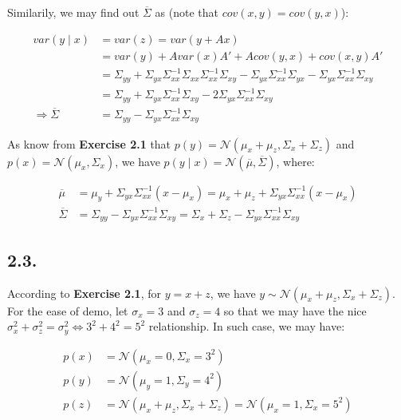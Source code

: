 \documentclass[11pt]{article}
\begin{document}
Similarily, we may find out $\overline{\Sigma}$ as (note that $cov(x, y) = cov(y, x)$):


\begin{align*}
    var(y \mid x) &= var(z) = var(y + Ax) \\
    &= var(y) + A var(x) A' + A cov(y, x) + cov(x, y) A' \\
    &= \Sigma_{yy} + \Sigma_{yx} \Sigma_{xx}^{-1} \Sigma_{xx} \Sigma_{xx}^{-1} \Sigma_{xy} - \Sigma_{yx} \Sigma_{xx}^{-1} \Sigma_{yx} - \Sigma_{yx} \Sigma_{xx}^{-1} \Sigma_{xy} \\
    &= \Sigma_{yy} + \Sigma_{yx} \Sigma_{xx}^{-1} \Sigma_{xy} - 2 \Sigma_{yx} \Sigma_{xx}^{-1} \Sigma_{xy} \\
    \Longrightarrow \overline{\Sigma}&= \Sigma_{yy} - \Sigma_{yx} \Sigma_{xx}^{-1} \Sigma_{xy}
\end{align*}


As know from \textbf{Exercise 2.1} that $p(y) = \mathcal N(\mu_x+\mu_z,\Sigma_x+\Sigma_z)$ and $p(x) = \mathcal N(\mu_x, \Sigma_x)$, we have $p(y \mid x) = \mathcal N(\overline{\mu}, \overline{\Sigma})$, where:

\begin{align*}
    \overline{\mu} &= \mu_y + \Sigma_{yx} \Sigma_{xx}^{-1} (x - \mu_x) = \mu_x + \mu_z + \Sigma_{yx} \Sigma_{xx}^{-1} (x - \mu_x) \\
    \overline{\Sigma} &=  \Sigma_{yy} - \Sigma_{yx} \Sigma_{xx}^{-1} \Sigma_{xy} = \Sigma_{x} + \Sigma_{z} -\Sigma_{yx} \Sigma_{xx}^{-1} \Sigma_{xy}
\end{align*}

\subsection*{2.3.}

According to \textbf{Exercise 2.1}, for $y = x + z$, we have $y \sim \mathcal N(\mu_x+\mu_z,\Sigma_x+\Sigma_z)$. For the ease of demo, let $\sigma_x = 3$ and $\sigma_z = 4$ so that we may have the nice $\sigma_x^2 + \sigma_z^2 = \sigma_y^2 \Longleftrightarrow 3^2 + 4^2 = 5^2$ relationship. In such case, we may have:




\begin{align*}
    p(x) &= \mathcal N(\mu_x = 0, \Sigma_x = 3^2) \\
    p(y) &= \mathcal N(\mu_y = 1, \Sigma_y = 4^2) \\
    p(z) &= \mathcal N(\mu_x+\mu_z,\Sigma_x+\Sigma_z) = \mathcal N(\mu_x = 1, \Sigma_x = 5^2)
\end{align*}
\end{document}
